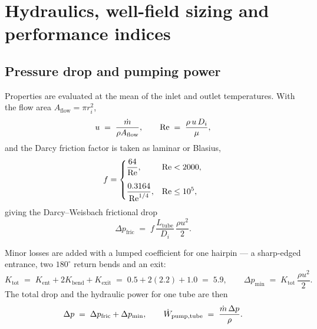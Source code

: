 \section{Hydraulics, well-field sizing and performance indices}
\label{sec:hydraulics}

\subsection{Pressure drop and pumping power}
\label{sec:hydraulics:dp}

Properties are evaluated at the mean of the inlet and outlet temperatures. With
the flow area $A_{\mathrm{flow}}=\pi r_{i}^{2}$,
\begin{equation}
  u \;=\; \frac{\dot m}{\rho A_{\mathrm{flow}}},
  \qquad
  \mathrm{Re} \;=\; \frac{\rho\,u\,D_{i}}{\mu},
\end{equation}
and the Darcy friction factor is taken as laminar or Blasius,
\begin{equation}
  f =
  \begin{dcases}
    \dfrac{64}{\mathrm{Re}}, & \mathrm{Re} < 2000, \\[6pt]
    \dfrac{0.3164}{\mathrm{Re}^{1/4}}, & \mathrm{Re} \leq 10^{5},
  \end{dcases}
  \label{eq:friction}
\end{equation}
giving the Darcy--Weisbach frictional drop
\begin{equation}
  \Delta p_{\mathrm{fric}}
  \;=\; f\,\frac{L_{\mathrm{tube}}}{D_{i}}\,\frac{\rho u^{2}}{2} .
  \label{eq:dp-fric}
\end{equation}

Minor losses are added with a lumped coefficient for one hairpin --- a
sharp-edged entrance, two $180^{\circ}$ return bends and an exit:
\begin{equation}
  K_{\mathrm{tot}}
  \;=\; K_{\mathrm{ent}} + 2K_{\mathrm{bend}} + K_{\mathrm{exit}}
  \;=\; 0.5 + 2(2.2) + 1.0 \;=\; 5.9,
  \qquad
  \Delta p_{\mathrm{min}} \;=\; K_{\mathrm{tot}}\,\frac{\rho u^{2}}{2} .
  \label{eq:dp-minor}
\end{equation}
The total drop and the hydraulic power for one tube are then
\begin{equation}
  \Delta p \;=\; \Delta p_{\mathrm{fric}} + \Delta p_{\mathrm{min}},
  \qquad
  \dot W_{\mathrm{pump,tube}} \;=\; \frac{\dot m\,\Delta p}{\rho} .
  \label{eq:dp}
\end{equation}

